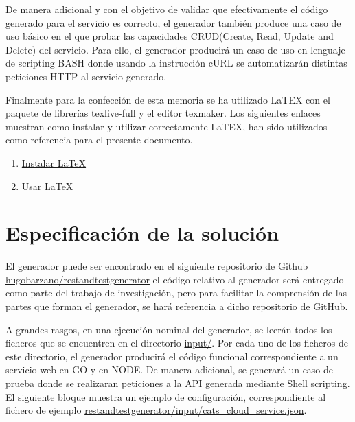 \documentclass[a4paper,11pt]{book}
\begin{document}
De manera adicional y con el objetivo de validar que efectivamente el código generado para el servicio es correcto, el generador también produce una caso de uso básico en el que probar las capacidades CRUD(Create, Read, Update and Delete) del servicio. Para ello, el generador producirá un caso de uso en lenguaje de scripting BASH\cite{bash} donde usando la instrucción cURL\cite{curl} se automatizarán distintas peticiones HTTP al servicio generado. 

Finalmente para la confección de esta memoria se ha utilizado LaTEX con el paquete de librerías texlive-full y el editor texmaker. Los siguientes enlaces muestran como instalar y utilizar correctamente LaTEX, han sido utilizados como referencia para el presente documento. 

\begin{enumerate}
\item \href{http://milq.github.io/install-latex-ubuntu-debian/}{Instalar LaTeX}
\item \href{ http://minisconlatex.blogspot.com.es/}{Usar LaTeX}
\end{enumerate}


\section{Especificación de la solución}

El generador puede ser encontrado en el siguiente repositorio de Github \href{ https://github.com/hugobarzano/restandtestgenerator}{hugobarzano/restandtestgenerator} el código relativo al generador será entregado como parte del trabajo de investigación, pero para facilitar la comprensión de las partes que forman el generador, se hará referencia a dicho repositorio de GitHub. 

A grandes rasgos, en una ejecución nominal del generador, se leerán todos los ficheros que se encuentren en el directorio  \href{https://github.com/hugobarzano/restandtestgenerator/tree/master/input}{input/}. Por cada uno de los ficheros de este directorio, el generador producirá el código funcional correspondiente a un servicio web en GO y en NODE. De manera adicional, se generará un caso de prueba donde se realizaran peticiones a la API generada mediante Shell scripting.  El siguiente bloque muestra un ejemplo de configuración, correspondiente al fichero de ejemplo  \href{https://github.com/hugobarzano/restandtestgenerator/blob/master/input/cats\_cloud\_service.json}{restandtestgenerator/input/cats\_cloud\_service.json}. 
\end{document}
